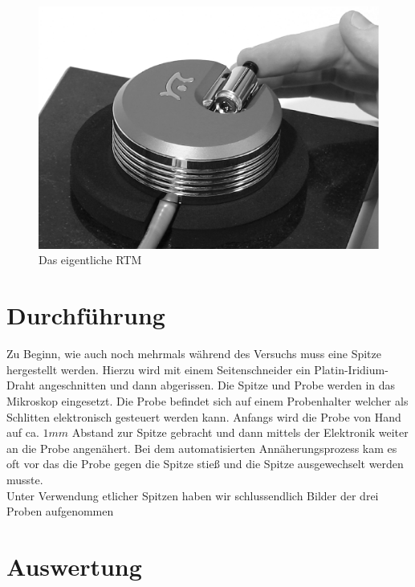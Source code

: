 \documentclass[12pt]{article}
\begin{document}
\begin{figure}[H]
\centering
\includegraphics[width=0.9\linewidth]{pictures/rastertunnel.eps}
\caption{Das eigentliche RTM}
\end{figure}
\section{Durchführung}
Zu Beginn, wie auch noch mehrmals während des Versuchs muss eine Spitze hergestellt werden. Hierzu wird mit einem Seitenschneider ein Platin-Iridium-Draht angeschnitten und dann abgerissen. Die Spitze und Probe werden in das Mikroskop eingesetzt. Die Probe befindet sich auf einem Probenhalter welcher als Schlitten elektronisch gesteuert werden kann. Anfangs wird die Probe von Hand auf ca. $1mm$ Abstand zur Spitze gebracht und dann mittels der Elektronik weiter an die Probe angenähert.
Bei dem automatisierten Annäherungsprozess kam es oft vor das die Probe gegen die Spitze stieß und die Spitze ausgewechselt werden musste. \\

Unter Verwendung etlicher Spitzen haben wir schlussendlich Bilder der drei Proben aufgenommen
\section{Auswertung}
\end{document}
